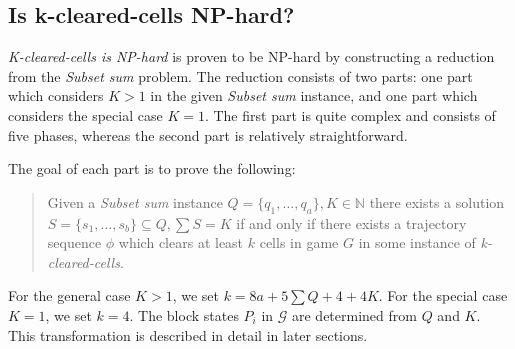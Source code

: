 \subsection{Is k-cleared-cells NP-hard?}
\label{sub:nphard}

\textit{K-cleared-cells is NP-hard} is proven to be NP-hard by constructing a reduction from the \textit{Subset sum} problem. The reduction consists of two parts: one part which considers $K > 1$ in the given \textit{Subset sum} instance, and one part which considers the special case $K = 1$. The first part is quite complex and consists of five phases, whereas the second part is relatively straightforward.

The goal of each part is to prove the following: 

\begin{quote}
Given a \textit{Subset sum} instance $Q = \{q_1, \ldots, q_a\}, K \in \mathbb{N}$ there exists a solution $S = \{s_1, \ldots, s_b \} \subseteq Q, \sum S = K$ if and only if there exists a trajectory sequence $\phi$ which clears at least $k$ cells in game $G$ in some instance of \textit{k-cleared-cells}.
\end{quote}

For the general case $K > 1$, we set $k = 8a + 5 \sum Q + 4 + 4K$. For the special case $K = 1$, we set $k = 4$. The block states $P_i$ in $\mathcal{G}$ are determined from $Q$ and $K$. This transformation is described in detail in later sections. 
















